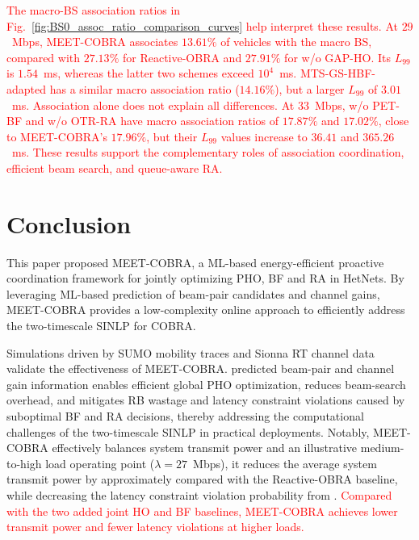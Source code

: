 \documentclass[conference, a4paper]{IEEEtran}
\newcommand{\rev}[1]{\textcolor{revisioncolor}{{}#1}}
\newcommand{\currentrev}[1]{\textcolor{red}{{}#1}}
\newif\ifshowdeletions
\newcommand{\currentdel}[1]{\ifshowdeletions\textcolor{deletioncolor}{\sout{#1}}\fi}
\theoremstyle{remark}
\begin{document}
\currentrev{The macro-BS association ratios in Fig.~\ref{fig:BS0_assoc_ratio_comparison_curves} help interpret these results. At $29$~Mbps, MEET-COBRA associates $13.61\%$ of vehicles with the macro BS, compared with $27.13\%$ for Reactive-OBRA and $27.91\%$ for w/o GAP-HO. Its $L_{99}$ is $1.54$~ms, whereas the latter two schemes exceed $10^4$~ms. MTS-GS-HBF-adapted has a similar macro association ratio ($14.16\%$), but a larger $L_{99}$ of $3.01$~ms. Association alone does not explain all differences. At $33$~Mbps, w/o PET-BF and w/o OTR-RA have macro association ratios of $17.87\%$ and $17.02\%$, close to MEET-COBRA's $17.96\%$, but their $L_{99}$ values increase to $36.41$ and $365.26$~ms. These results support the complementary roles of association coordination, efficient beam search, and queue-aware RA.}


\section{Conclusion}

This paper proposed MEET-COBRA, a ML-based energy-efficient proactive coordination framework for jointly optimizing PHO, BF and RA in HetNets.
By leveraging ML-based prediction of beam-pair candidates and channel gains, MEET-COBRA provides a low-complexity online approach to efficiently address the two-timescale SINLP for COBRA.

Simulations driven by SUMO mobility traces and Sionna RT channel data validate the effectiveness of MEET-COBRA.
\currentdel{The ML-driven proactive optimization mechanism delivers substantial gains: the} predicted beam-pair and channel gain information enables efficient global PHO optimization, reduces beam-search overhead, and mitigates RB wastage and latency constraint violations caused by suboptimal BF and RA decisions, thereby addressing the computational challenges of the two-timescale SINLP in practical deployments. 
Notably, MEET-COBRA effectively balances system transmit power and \currentdel{latency reliability}\currentdel{: at} an illustrative medium-to-high load operating point ($\lambda=27$~Mbps), it reduces the average system transmit power by approximately \currentdel{32\%} compared with the Reactive-OBRA baseline, while decreasing the latency constraint violation probability from \currentdel{29.47\% to 0.68\%}. \currentrev{Compared with the two added joint HO and BF baselines, MEET-COBRA achieves lower transmit power and fewer latency violations at higher loads.}
\end{document}
